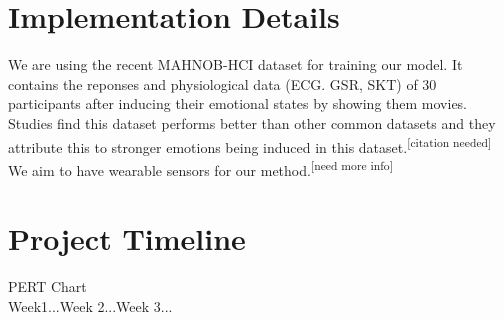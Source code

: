 \documentclass[11pt]{article}
\theoremstyle{definition}
\begin{document}
  \section{Implementation Details}
    We are using the recent MAHNOB-HCI dataset\cite{soleymani_multimodal_2012} for training our model. 
    It contains the reponses and physiological data (ECG. GSR, SKT) of 30 participants after inducing their emotional states by showing them movies. 
    Studies find this dataset performs better than other common datasets and they attribute this to stronger emotions being induced in this dataset.\textsuperscript{[citation needed]}
    We aim to have wearable sensors for our method.\textsuperscript{[need more info]}

  \section{Project Timeline}
    PERT Chart\\
    Week1...Week 2...Week 3...
  
  \newpage
  
  
\end{document}
